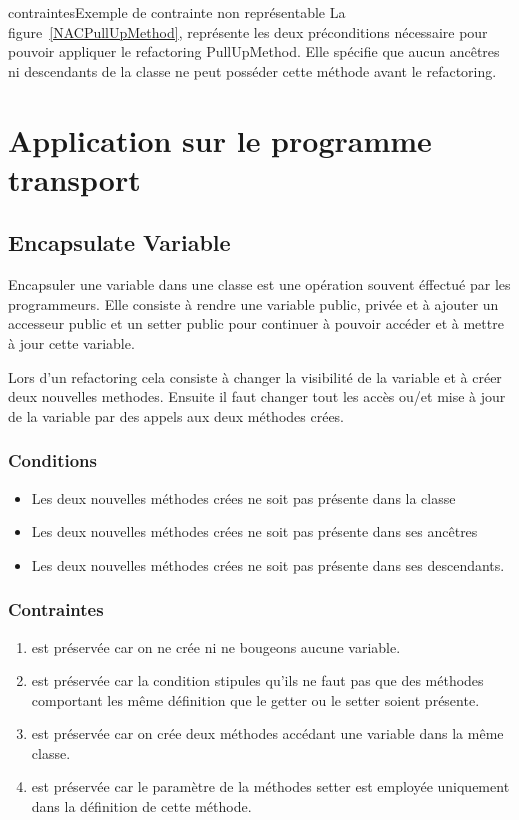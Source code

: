 \documentclass[a4paper, 12pt]{article}
\begin{document}
\begin{figu}{contraintes}{Exemple de contrainte non représentable}
La figure~\ref{NACPullUpMethod}, représente les deux préconditions nécessaire pour pouvoir appliquer le refactoring PullUpMethod.
Elle spécifie que aucun ancêtres ni descendants de la classe ne peut posséder cette méthode avant le refactoring.


\section{Application sur le programme transport}

\subsection{Encapsulate Variable}

Encapsuler une variable dans une classe est une opération souvent éffectué par les programmeurs.
Elle consiste à rendre une variable public, privée et à ajouter un accesseur public et un setter public pour continuer à pouvoir accéder et à mettre à jour cette variable.

Lors d'un refactoring cela consiste à changer la visibilité de la variable et à créer deux nouvelles methodes. Ensuite il faut changer tout les accès ou/et mise à jour de la variable par des appels aux deux méthodes crées.

\subsubsection{Conditions}

\begin{itemize}[label=\textbullet]
\item Les deux nouvelles méthodes crées ne soit pas présente dans la classe
\item Les deux nouvelles méthodes crées ne soit pas présente dans ses ancêtres
\item Les deux nouvelles méthodes crées ne soit pas présente dans ses descendants.
\end{itemize}

\subsubsection{Contraintes}

\begin{enumerate}
\item est préservée car on ne crée ni ne bougeons aucune variable.
\item est préservée car la condition stipules qu'ils ne faut pas que des méthodes comportant les même définition que le getter ou le setter soient présente.
\item est préservée car on crée deux méthodes accédant une variable dans la même classe.
\item est préservée car le paramètre de la méthodes setter est employée uniquement dans la définition de cette méthode.
\end{enumerate}


\end{figu}
\end{document}
